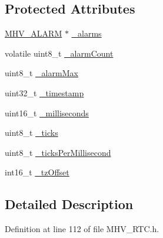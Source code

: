 \subsection*{\-Protected \-Attributes}
\begin{DoxyCompactItemize}
\item 
\hyperlink{_m_h_v___r_t_c_8h_af13307658f41fba330ffae04dd5cbce6}{\-M\-H\-V\-\_\-\-A\-L\-A\-R\-M} $\ast$ \hyperlink{class_m_h_v___r_t_c_afaaed6deea21b52f8bde5f8ebc0abf70}{\-\_\-alarms}
\item 
volatile uint8\-\_\-t \hyperlink{class_m_h_v___r_t_c_a953a79952c9fa5fde5d1dacbc03d3b46}{\-\_\-alarm\-Count}
\item 
uint8\-\_\-t \hyperlink{class_m_h_v___r_t_c_aed7d37466a99362b78dd9ccf1390d35c}{\-\_\-alarm\-Max}
\item 
uint32\-\_\-t \hyperlink{class_m_h_v___r_t_c_a6ac0d6f1b8985cd6113249693da50104}{\-\_\-timestamp}
\item 
uint16\-\_\-t \hyperlink{class_m_h_v___r_t_c_acd3e486b5e5ee1d8cf9d961c0fdbde57}{\-\_\-milliseconds}
\item 
uint8\-\_\-t \hyperlink{class_m_h_v___r_t_c_ab29c30f80f7234394299476c73f36baf}{\-\_\-ticks}
\item 
uint8\-\_\-t \hyperlink{class_m_h_v___r_t_c_a48e7d03e90e78881ed8833d6e4f77b36}{\-\_\-ticks\-Per\-Millisecond}
\item 
int16\-\_\-t \hyperlink{class_m_h_v___r_t_c_af9e544307713892ec196261247213490}{\-\_\-tz\-Offset}
\end{DoxyCompactItemize}


\subsection{\-Detailed \-Description}


\-Definition at line 112 of file \-M\-H\-V\-\_\-\-R\-T\-C.\-h.




